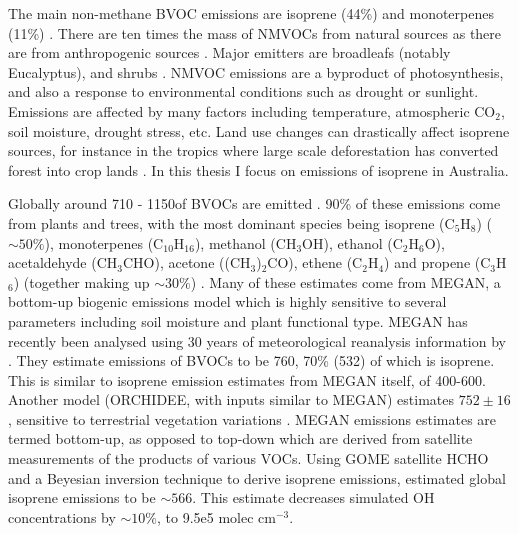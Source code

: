     The main non-methane BVOC emissions are isoprene (44\%) and monoterpenes (11\%) \parencite{Guenther2000, Kefauver2014}. 
    There are ten times the mass of NMVOCs from natural sources as there are from anthropogenic sources \parencite{Guenther2006, Kanakidou2005, Millet2006}.
    Major emitters are broadleafs (notably Eucalyptus), and shrubs \parencite{Guenther2006, Arneth2008, Niinemets2010, Monks2015}.
    NMVOC emissions are a byproduct of photosynthesis, and also a response to environmental conditions such as drought or sunlight.
    Emissions are affected by many factors including temperature, atmospheric CO$_2$, soil moisture, drought stress, etc.
    Land use changes can drastically affect isoprene sources, for instance in the tropics where large scale deforestation has converted forest into crop lands \parencite{Kanakidou2005}.
    In this thesis I focus on emissions of isoprene in Australia.
    
    Globally around 710 - 1150\tgcpyr of BVOCs are emitted \parencite{Guenther1995,Lathiere2006,Guenther2012, Lathiere2016}.
    90\% of these emissions come from plants and trees, with the most dominant species being isoprene (C$_5$H$_8$) ($\sim50\%$), monoterpenes (C$_10$H$_16$), methanol (CH$_3$OH), ethanol (C$_2$H$_6$O), acetaldehyde (CH$_3$CHO), acetone ((CH$_3$)$_2$CO), ethene (C$_2$H$_4$) and propene (C$_3$H$_6$) (together making up $\sim30\%$) \parencite{Guenther2012}.
    Many of these estimates come from MEGAN, a bottom-up biogenic emissions model which is highly sensitive to several parameters including soil moisture and plant functional type.
    MEGAN has recently been analysed using 30 years of meteorological reanalysis information by \textcite{Sindelarova2014}.
    They estimate emissions of BVOCs to be 760\tgcpyr, 70\% (532\tgcpyr) of which is isoprene.
    This is similar to isoprene emission estimates from MEGAN itself, of 400-600\tgcpyr \parencite{Guenther2006}.
    Another model (ORCHIDEE, with inputs similar to MEGAN) estimates $752\pm16$\tgcpyr, sensitive to terrestrial vegetation variations \parencite{Lathiere2006}.
    MEGAN emissions estimates are termed bottom-up, as opposed to top-down which are derived from satellite measurements of the products of various VOCs.
    Using GOME satellite HCHO and a Beyesian inversion technique to derive isoprene emissions, \textcite{Shim2005} estimated global isoprene emissions to be $\sim566$\tgcpyr. 
    This estimate decreases simulated OH concentrations by $\sim10\%$, to 9.5e5 molec cm$^{-3}$.
    
